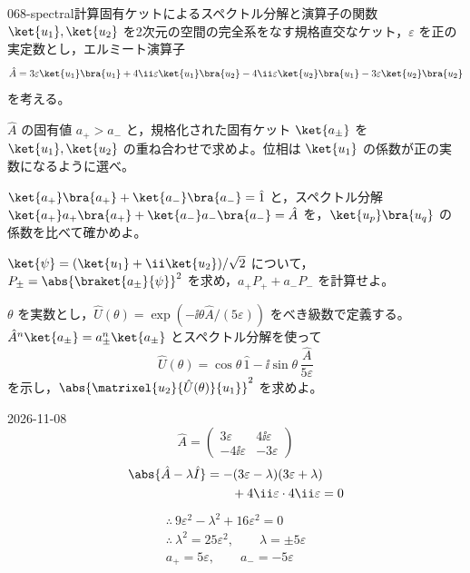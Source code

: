 \documentclass[uplatex,dvipdfmx,a4paper,11pt]{jsarticle}
\begin{document}
\begin{mondai}{068-spectral}{計算}{固有ケットによるスペクトル分解と演算子の関数}
$\ket{u_{1}},\ket{u_{2}}$ を2次元の空間の完全系をなす規格直交なケット，$\varepsilon$ を正の実定数とし，エルミート演算子
  \[ \hat{A}=3\varepsilon\ket{u_{1}}\bra{u_{1}}+4\ii\varepsilon\ket{u_{1}}\bra{u_{2}}-4\ii\varepsilon\ket{u_{2}}\bra{u_{1}}-3\varepsilon\ket{u_{2}}\bra{u_{2}} \]
  を考える。
  \begin{shoumon}
    \item $\hat{A}$ の固有値 $a_{+}>a_{-}$ と，規格化された固有ケット $\ket{a_{\pm}}$ を $\ket{u_{1}},\ket{u_{2}}$ の重ね合わせで求めよ。位相は $\ket{u_{1}}$ の係数が正の実数になるように選べ。
    \item $\ket{a_{+}}\bra{a_{+}}+\ket{a_{-}}\bra{a_{-}}=\hat{1}$ と，スペクトル分解 $\ket{a_{+}}a_{+}\bra{a_{+}}+\ket{a_{-}}a_{-}\bra{a_{-}}=\hat{A}$ を，$\ket{u_{p}}\bra{u_{q}}$ の係数を比べて確かめよ。
    \item $\ket{\psi}=(\ket{u_{1}}+\ii\ket{u_{2}})/\sqrt{2}$ について，$P_{\pm}=\abs{\braket{a_{\pm}}{\psi}}^{2}$ を求め，$a_{+}P_{+}+a_{-}P_{-}$ を計算せよ。
    \item $\theta$ を実数とし，$\hat{U}(\theta)=\exp(-\ii\theta\hat{A}/(5\varepsilon))$ をべき級数で定義する。$\hat{A}^{n}\ket{a_{\pm}}=a_{\pm}^{n}\ket{a_{\pm}}$ とスペクトル分解を使って
    \[ \hat{U}(\theta)=\cos\theta\,\hat{1}-\ii\sin\theta\,\frac{\hat{A}}{5\varepsilon} \]
    を示し，$\abs{\matrixel{u_{2}}{\hat{U}(\theta)}{u_{1}}}^{2}$ を求めよ。
  \end{shoumon}
\begin{kotaeutsushi}{2026-11-08}
\[ \hat{A}=\begin{pmatrix}3\varepsilon&4\ii\varepsilon\\-4\ii\varepsilon&-3\varepsilon\end{pmatrix} \]
\begin{align*}
\abs{\hat{A}-\lambda\hat{I}}&=-(3\varepsilon-\lambda)(3\varepsilon+\lambda)\\
&\qquad+4\ii\varepsilon\cdot4\ii\varepsilon=0
\end{align*}
\begin{gather*}
\therefore\ 9\varepsilon^{2}-\lambda^{2}+16\varepsilon^{2}=0\\
\therefore\ \lambda^{2}=25\varepsilon^{2},\qquad \lambda=\pm5\varepsilon\\
a_{+}=5\varepsilon,\qquad a_{-}=-5\varepsilon

\end{gather*}
\end{kotaeutsushi}
\end{mondai}
\end{document}
